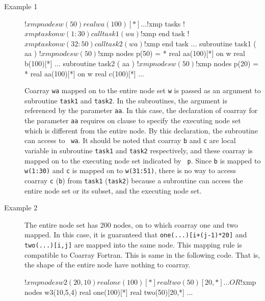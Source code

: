 \begin{description}
\item[Example 1]
\hspace{\hsize}
\begin{Fexample}
!$xmp nodes w(50)
      real wa(100)[*]
      ...
!$xmp tasks
!$xmp task on w(1:30)
      call task1 ( wa )
!$xmp end task
!$xmp task on w(32:50)
      call task2 ( wa )
!$xmp end task
      ...
      subroutine task1 ( aa )
!$xmp nodes w(50)
!$xmp nodes p(50) = *
      real aa(100)[*] on w
      real b(100)[*] 
      ...
      subroutine task2 ( aa )
!$xmp nodes w(50)
!$xmp nodes p(20) = *
      real aa(100)[*] on w
      real c(100)[*] 
      ...
\end{Fexample}

Coarray {\tt wa} mapped on to the entire node set {\tt w} is passed as an
argument to subroutine {\tt task1} and {\tt task2}. In the
subroutines, the argument is referenced by the parameter {\tt aa}. In this
case, the declaration of coarray for the parameter {\tt aa} requires on
clause to specify the executing node set which is different from the
entire node. By this declaration, the subroutine can access to {\tt
  wa}. It should be noted that coarray {\tt b} and {\tt c} are local
variable in subroutine {\tt task1} and {\tt task2} respectively, and
these coarray is mapped on to the executing node set indicated by {\tt
  p}. Since {\tt b} is mapped to {\tt w(1:30)} and {\tt c} is mapped
on to {\tt   w(31:51)}, there is no way to access coarray {\tt c}
({\tt b}) from {\tt task1} ({\tt task2}) because a subroutine can
access the entire node set or its subset, and the executing node set. 

\item[Example 2]
\hspace{\hsize}

The entire node set has 200 nodes, on to which coarray one and two
mapped. In this case, it is guaranteed that {\tt one(...)[i+(j-1)*20]}
and {\tt two(...)[i,j]} are mapped into the same node. This mapping rule 
is compatible to Coarray Fortran. This is same in the following
code. That is, the shape of the entire node have nothing to coarray.  

\begin{Fexample}
!$xmp nodes w2(20,10)
      real one(100)[*]
      real two(50)[20,*]
      ...
OR
!$xmp nodes w3(10,5,4)
      real one(100)[*]
      real two(50)[20,*]
      ...
\end{Fexample}


\end{description}
